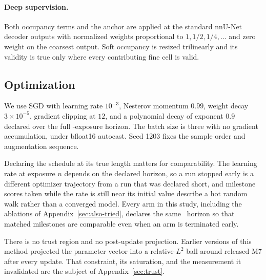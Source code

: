 \paragraph{Deep supervision.}
Both occupancy terms and the anchor are applied at the standard nnU-Net decoder
outputs with normalized weights proportional to $1,1/2,1/4,\ldots$ and zero
weight on the coarsest output. Soft occupancy is resized trilinearly and its
validity is true only where every contributing fine cell is valid.

\subsection{Optimization}

We use SGD with learning rate $10^{-3}$, Nesterov momentum $0.99$, weight decay
$3\times10^{-5}$, gradient clipping at $12$, and a polynomial decay of exponent
$0.9$ declared over the full \fzHorizon-exposure horizon.
The batch size is three with no gradient accumulation, under bfloat16 autocast.
Seed 1203 fixes the sample order and augmentation sequence.

Declaring the schedule at its true length matters for comparability.
The learning rate at exposure $n$ depends on the declared horizon, so a run
stopped early is a different optimizer trajectory from a run that was declared
short, and milestone scores taken while the rate is still near its initial value
describe a hot random walk rather than a converged model.
Every arm in this study, including the ablations of
Appendix~\ref{sec:also-tried}, declares the same \fzHorizon\ horizon so that
matched milestones are comparable even when an arm is terminated early.

There is no trust region and no post-update projection.
Earlier versions of this method projected the parameter vector into a
relative-$L^2$ ball around released M7 after every update.
That constraint, its saturation, and the measurement it invalidated are the
subject of Appendix~\ref{sec:trust}.
